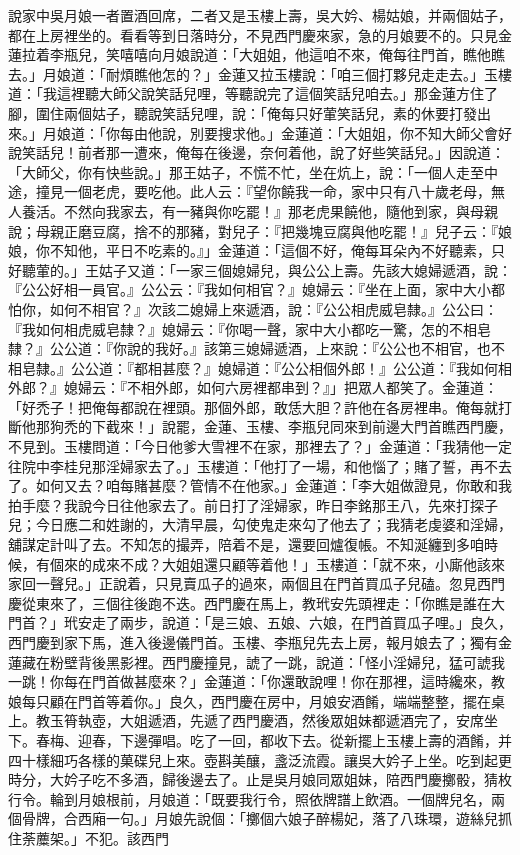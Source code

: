 \begin{showcontents}{}
說家中吳月娘一者置酒回席，二者又是玉樓上壽，吳大妗、楊姑娘，并兩個姑子，都在上房裡坐的。看看等到日落時分，不見西門慶來家，急的月娘要不的。只見金蓮拉着李瓶兒，笑嘻嘻向月娘說道：「大姐姐，他這咱不來，俺每往門首，瞧他瞧去。」月娘道：「耐煩瞧他怎的？」金蓮又拉玉樓說：「咱三個打夥兒走走去。」玉樓道：「我這裡聽大師父說笑話兒哩，等聽說完了這個笑話兒咱去。」那金蓮方住了腳，圍住兩個姑子，聽說笑話兒哩，說：「俺每只好葷笑話兒，素的休要打發出來。」月娘道：「你每由他說，別要搜求他。」金蓮道：「大姐姐，你不知大師父會好說笑話兒！前者那一遭來，俺每在後邊，奈何着他，說了好些笑話兒。」因說道：「大師父，你有快些說。」那王姑子，不慌不忙，坐在炕上，說：「一個人走至中途，撞見一個老虎，要吃他。此人云：『望你饒我一命，家中只有八十歲老母，無人養活。不然向我家去，有一豬與你吃罷！』那老虎果饒他，隨他到家，與母親說；母親正磨豆腐，捨不的那豬，對兒子：『把幾塊豆腐與他吃罷！』兒子云：『娘娘，你不知他，平日不吃素的。』」金蓮道：「這個不好，俺每耳朵內不好聽素，只好聽葷的。」王姑子又道：「一家三個媳婦兒，與公公上壽。先該大媳婦遞酒，說：『公公好相一員官。』公公云：『我如何相官？』媳婦云：『坐在上面，家中大小都怕你，如何不相官？』次該二媳婦上來遞酒，說：『公公相虎威皂隸。』公公曰：『我如何相虎威皂隸？』媳婦云：『你喝一聲，家中大小都吃一驚，怎的不相皂隸？』公公道：『你說的我好。』該第三媳婦遞酒，上來說：『公公也不相官，也不相皂隸。』公公道：『都相甚麼？』媳婦道：『公公相個外郎！』公公道：『我如何相外郎？』媳婦云：『不相外郎，如何六房裡都串到？』」把眾人都笑了。金蓮道：「好禿子！把俺每都說在裡頭。那個外郎，敢恁大胆？許他在各房裡串。俺每就打斷他那狗禿的下截來！」說罷，金蓮、玉樓、李瓶兒同來到前邊大門首瞧西門慶，不見到。玉樓問道：「今日他爹大雪裡不在家，那裡去了？」金蓮道：「我猜他一定往院中李桂兒那淫婦家去了。」玉樓道：「他打了一場，和他惱了；賭了誓，再不去了。如何又去？咱每賭甚麼？管情不在他家。」金蓮道：「李大姐做證見，你敢和我拍手麼？我說今日往他家去了。前日打了淫婦家，昨日李銘那王八，先來打探子兒；今日應二和姓謝的，大清早晨，勾使鬼走來勾了他去了；我猜老虔婆和淫婦，舖謀定計叫了去。不知怎的撮弄，陪着不是，還要回爐復帳。不知涎纏到多咱時候，有個來的成來不成？大姐姐還只顧等着他！」玉樓道：「就不來，小廝他該來家回一聲兒。」正說着，只見賣瓜子的過來，兩個且在門首買瓜子兒磕。忽見西門慶從東來了，三個往後跑不迭。西門慶在馬上，教玳安先頭裡走：「你瞧是誰在大門首？」玳安走了兩步，說道：「是三娘、五娘、六娘，在門首買瓜子哩。」良久，西門慶到家下馬，進入後邊儀門首。玉樓、李瓶兒先去上房，報月娘去了；獨有金蓮藏在粉壁背後黑影裡。西門慶撞見，諕了一跳，說道：「怪小淫婦兒，猛可諕我一跳！你每在門首做甚麼來？」金蓮道：「你還敢說哩！你在那裡，這時纔來，教娘每只顧在門首等着你。」良久，西門慶在房中，月娘安酒餚，端端整整，擺在桌上。教玉筲執壺，大姐遞酒，先遞了西門慶酒，然後眾姐妹都遞酒完了，安席坐下。春梅、迎春，下邊彈唱。吃了一回，都收下去。從新擺上玉樓上壽的酒餚，并四十樣細巧各樣的菓碟兒上來。壺斟美釀，盞泛流霞。讓吳大妗子上坐。吃到起更時分，大妗子吃不多酒，歸後邊去了。止是吳月娘同眾姐妹，陪西門慶擲骰，猜枚行令。輪到月娘根前，月娘道：「既要我行令，照依牌譜上飲酒。一個牌兒名，兩個骨牌，合西廂一句。」月娘先說個：「擲個六娘子醉楊妃，落了八珠環，遊絲兒抓住荼蘪架。」不犯。該西門
\end{showcontents}
